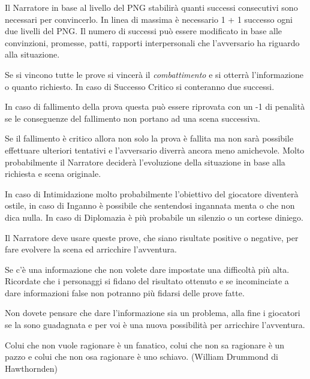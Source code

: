 \begin{multicols}{2}
Il Narratore in base al livello del PNG stabilirà quanti successi consecutivi sono necessari per convincerlo. In linea di massima è necessario 1 + 1 successo ogni due livelli del PNG. Il numero di successi può essere modificato in base alle convinzioni, promesse, patti, rapporti interpersonali che l'avversario ha riguardo alla situazione.

Se si vincono tutte le prove si vincerà il \emph{combattimento} e si otterrà l'informazione o quanto richiesto. In caso di Successo Critico si conteranno due successi.

In caso di fallimento della prova questa può essere riprovata con un -1 di penalità se le conseguenze del fallimento non portano ad una scena successiva.

\begin{figure}

\centering
\end{figure}

Se il fallimento è critico allora non solo la prova è fallita ma non sarà possibile effettuare ulteriori tentativi e l'avversario diverrà ancora meno amichevole. Molto probabilmente il Narratore deciderà l'evoluzione della situazione in base alla richiesta e scena originale.

In caso di Intimidazione molto probabilmente l'obiettivo del giocatore diventerà ostile, in caso di Inganno è possibile che sentendosi ingannata menta o che non dica nulla. In caso di Diplomazia è più probabile un silenzio o un cortese diniego.

Il Narratore deve usare queste prove, che siano risultate positive o negative, per fare evolvere la scena ed arricchire l'avventura.

Se c'è una informazione che non volete dare impostate una difficoltà più alta.
Ricordate che i personaggi si fidano del risultato ottenuto e se incominciate a dare informazioni false non potranno più fidarsi delle prove fatte.

Non dovete pensare che dare l'informazione sia un problema, alla fine i giocatori se la sono guadagnata e per voi è una nuova possibilità per arricchire l'avventura.

\end{multicols}

\vfill

\begin{changemargin}{0.3cm}{0.3cm}\begin{enfasi}{
Colui che non vuole ragionare è un fanatico, colui che non sa ragionare è un pazzo e colui che non osa ragionare è uno schiavo. (William Drummond di Hawthornden)
}\end{enfasi}\end{changemargin}

\pagebreak


